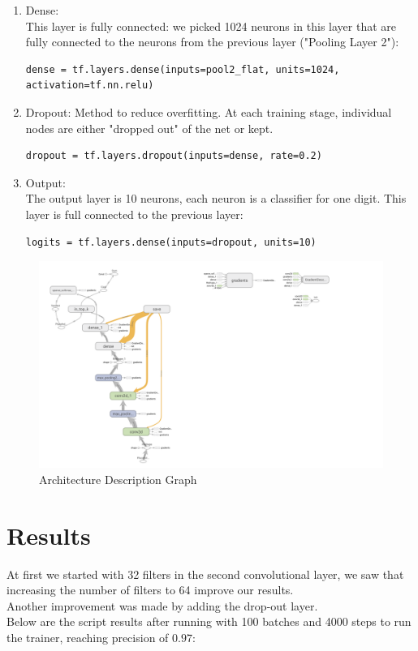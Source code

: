 \documentclass[12pt]{article}
\begin{document}
\begin{enumerate}
\item
Dense:\\
This layer is fully connected: we picked 1024 neurons in this layer that are fully connected to the neurons from the previous layer ("Pooling Layer 2"):
\begin{lstlisting}[style=PyStyle]
         dense = tf.layers.dense(inputs=pool2_flat, units=1024, activation=tf.nn.relu)    
\end{lstlisting}

\item
Dropout:
Method to reduce overfitting.
At each training stage, individual nodes are either "dropped out" of the net or kept. 

\begin{lstlisting}[style=PyStyle]
    dropout = tf.layers.dropout(inputs=dense, rate=0.2)
\end{lstlisting}

\item
Output:\\
The output layer is 10 neurons, each neuron is a classifier for one digit. This layer is full connected to the previous layer:
\begin{lstlisting}[style=PyStyle]
    logits = tf.layers.dense(inputs=dropout, units=10)
\end{lstlisting}

\end{enumerate}

\begin{figure}[H]
\caption{Architecture Description Graph}
\centering
\includegraphics[width=\linewidth]{Graphs.png}
\end{figure}

\newpage	

\section{Results}
At first we started with 32 filters in the second  convolutional layer, we saw that increasing the number of filters to 64 improve our results. \\
Another improvement was made by adding the drop-out layer. \\
Below are the script results after running with 100 batches and 4000 steps to run the trainer, reaching precision of $0.97$:\\
\end{document}
